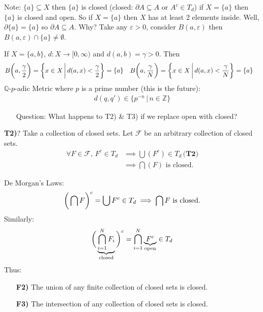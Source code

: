 \documentclass[10pt]{article}
\begin{document}
Note: $\{a\}\subseteq X$ then $\{a\}$ is closed (closed: $\partial A\subseteq A$ or $A^{c}\in T_{d}$) if $X=\{a\}$ then $\{a\}$ is closed and open. So if $X=\{a\}$ then $X$ has at least 2 elements inside. Well, $\partial\{a\}=\{a\}$ so $\partial A\subseteq A$. Why? Take any $\varepsilon>0$, consider $B(a,\varepsilon)$ then $B(a,\varepsilon)\cap\{a\}\neq\emptyset$. 

If $X=\{a,b\}$, $d:X\to[0,\infty)$ and $d(a,b)=\gamma>0$. Then
\begin{align*}
    B\bigg{(}a,\frac{\gamma}{2}\bigg{)}
    &=\bigg{\{}x\in X\,\bigg{|}\,d(a,x)<\frac{\gamma}{2}\bigg{\}}=\{a\} 
    & B\bigg{(}a,\frac{\gamma}{N}\bigg{)}
    &=\bigg{\{}x\in X\,\bigg{|}\,d(a,x)<\frac{\gamma}{N}\bigg{\}}=\{a\}
\end{align*}
$\mathbb{Q}$-$p$-adic Metric where $p$ is a prime number (this is the future):
\begin{align*}
    d(q,q')\in\{p^{-n}\,|\,n\in\mathbb{Z}\}
\end{align*}
\newpage
\begin{itemize}
    \item[Question:] What happens to T2) \& T3) if we replace open with closed?
\end{itemize}


\textbf{T2)}? Take a collection of closed sets. Let $\mathcal{F}$ be an arbitrary collection of closed sets.
\begin{align*}
    \forall F\in\mathcal{F},\, F^{c}\in T_{d}&\implies\bigcup(F^{c})\in T_{d}\,\textbf{(T2)}\\
    &\implies\bigcap(F)\text{ is closed}.
\end{align*}


De Morgan's Laws:
\begin{align*}
    \bigg{(}\bigcap F\bigg{)}^{c}=\bigcup F^{c}\in T_{d}\implies\bigcap F\text{ is closed.}
\end{align*}
Similarly:
\begin{align*}
    \bigg{(}\underbrace{\bigcap^{N}_{i=1} F_{i}}_{\text{closed}}\bigg{)}^{c}=\bigcap^{N}_{i=1}\underbrace{F^{c}}_{\text{open}}\in T_{d}
\end{align*}
Thus:
\begin{itemize}
    \item[\textbf{F2)}] The union of any finite collection of closed sets is closed.
    \item[\textbf{F3)}] The intersection of any collection of closed sets is closed.
\end{itemize}
\end{document}
